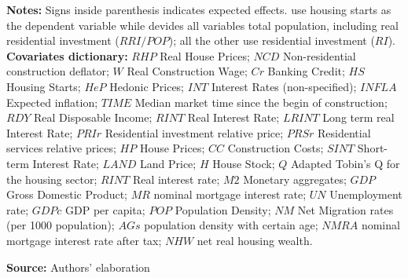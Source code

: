 \begin{table}[H]
\begin{threeparttable}
    \footnotesize{\textbf{Notes:} Signs inside parenthesis indicates expected effects. \textcite{topel_1988_Housing} use housing starts as the dependent variable while \textcite{fair_macroeconometric_2018} devides all variables total population, including real residential investment ($RRI/POP$); all the other use residential investment ($RI$). \textbf{Covariates dictionary:} $RHP$ Real House Prices; $NCD$ Non-residential construction deflator; $W$ Real Construction Wage; $Cr$ Banking Credit; $HS$ Housing Starts; $HeP$ Hedonic Prices; $INT$ Interest Rates (non-specified); $INFLA$ Expected inflation; $TIME$ Median market time since the begin of construction; $RDY$ Real Disposable Income; $RINT$ Real Interest Rate; $LRINT$ Long term real Interest Rate; $PRIr$ Residential investment relative price; $PRSr$ Residential services relative prices; $HP$ House Prices; $CC$ Construction Costs; $SINT$ Short-term Interest Rate; $LAND$ Land Price; $H$ House Stock; $Q$ Adapted Tobin's Q for the housing sector; $RINT$ Real interest rate; $M2$ Monetary aggregates; $GDP$ Gross Domestic Product; $MR$ nominal mortgage interest rate; $UN$ Unemployment rate; $GDPc$ GDP per capita; $POP$ Population Density; $NM$ Net Migration rates (per 1000 population); $AGs$ population density with certain age; $NMRA$ nominal mortgage interest rate after tax; $NHW$ net real housing wealth.}
  \end{threeparttable}
    \caption*{\textbf{Source:} Authors' elaboration}
\end{table}

